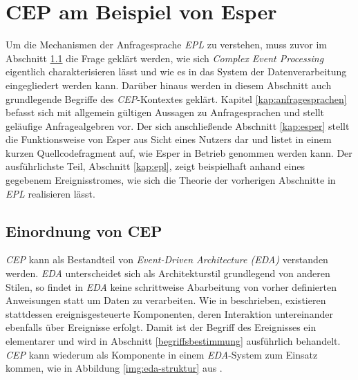 \documentclass{acm_proc_article-sp}
\begin{document}
%
%

\section{CEP am Beispiel von Esper}
\vspace{0.1cm}

Um die Mechanismen der Anfragesprache \textit{EPL} zu verstehen, muss zuvor im Abschnitt 
\ref{kap:einordnung} die Frage 
geklärt werden, wie sich \textit{Complex Event Processing} eigentlich charakterisieren 
lässt und wie es in das System der Datenverarbeitung eingegliedert werden kann. Darüber 
hinaus werden in diesem Abschnitt auch grundlegende Begriffe des \textit{CEP}-Kontextes 
geklärt. Kapitel \ref{kap:anfragesprachen} befasst sich mit allgemein gültigen Aussagen 
zu Anfragesprachen und stellt geläufige Anfragealgebren vor. Der sich anschließende 
Abschnitt \ref{kap:esper} stellt die Funktionsweise von Esper aus Sicht eines Nutzers dar 
und listet in einem kurzen Quellcodefragment auf, wie Esper in Betrieb genommen werden 
kann. Der ausführlichste Teil, Abschnitt \ref{kap:epl}, zeigt beispielhaft anhand eines 
gegebenem Ereignisstromes, wie sich die Theorie der vorherigen Abschnitte in 
\textit{EPL} realisieren lässt.


\subsection{Einordnung von CEP}\label{kap:einordnung}
\vspace{0.1cm}
\textit{CEP} kann als Bestandteil von \textit{Event-Driven Architecture (EDA)} verstanden 
werden. \textit{EDA} unterscheidet sich als Architekturstil 
grundlegend von anderen Stilen, so findet in \textit{EDA} keine schrittweise Abarbeitung 
von vorher definierten Anweisungen statt um Daten zu verarbeiten. Wie in \cite{glossary} 
beschrieben, existieren stattdessen ereignisgesteuerte Komponenten, deren Interaktion 
untereinander ebenfalls über Ereignisse erfolgt. Damit ist der Begriff des Ereignisses 
ein elementarer und wird in Abschnitt \ref{begriffsbestimmung} ausführlich behandelt. 
\textit{CEP} kann wiederum als Komponente in einem \textit{EDA}-System zum Einsatz 
kommen, wie in Abbildung \ref{img:eda-struktur} aus \cite{bruns}.
\end{document}
